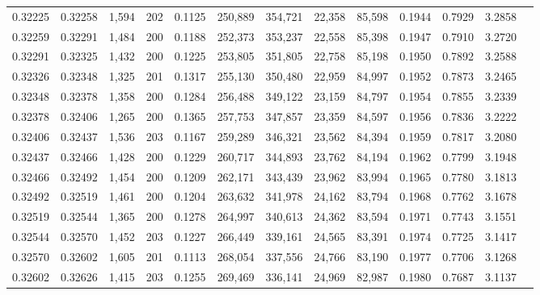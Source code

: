 \begin{tabular}{rrrrrrrrrrrrr}
0.32225 & 0.32258 & 1,594 & 202 &                                     0.1125 & 250,889 & 354,721 &  22,358 &  85,598 & 0.1944 & 0.7929 & 3.2858 \\
0.32259 & 0.32291 & 1,484 & 200 &                                     0.1188 & 252,373 & 353,237 &  22,558 &  85,398 & 0.1947 & 0.7910 & 3.2720 \\
0.32291 & 0.32325 & 1,432 & 200 &                                     0.1225 & 253,805 & 351,805 &  22,758 &  85,198 & 0.1950 & 0.7892 & 3.2588 \\
0.32326 & 0.32348 & 1,325 & 201 &                                     0.1317 & 255,130 & 350,480 &  22,959 &  84,997 & 0.1952 & 0.7873 & 3.2465 \\
0.32348 & 0.32378 & 1,358 & 200 &                                     0.1284 & 256,488 & 349,122 &  23,159 &  84,797 & 0.1954 & 0.7855 & 3.2339 \\
0.32378 & 0.32406 & 1,265 & 200 &                                     0.1365 & 257,753 & 347,857 &  23,359 &  84,597 & 0.1956 & 0.7836 & 3.2222 \\
0.32406 & 0.32437 & 1,536 & 203 &                                     0.1167 & 259,289 & 346,321 &  23,562 &  84,394 & 0.1959 & 0.7817 & 3.2080 \\
0.32437 & 0.32466 & 1,428 & 200 &                                     0.1229 & 260,717 & 344,893 &  23,762 &  84,194 & 0.1962 & 0.7799 & 3.1948 \\
0.32466 & 0.32492 & 1,454 & 200 &                                     0.1209 & 262,171 & 343,439 &  23,962 &  83,994 & 0.1965 & 0.7780 & 3.1813 \\
0.32492 & 0.32519 & 1,461 & 200 &                                     0.1204 & 263,632 & 341,978 &  24,162 &  83,794 & 0.1968 & 0.7762 & 3.1678 \\
0.32519 & 0.32544 & 1,365 & 200 &                                     0.1278 & 264,997 & 340,613 &  24,362 &  83,594 & 0.1971 & 0.7743 & 3.1551 \\
0.32544 & 0.32570 & 1,452 & 203 &                                     0.1227 & 266,449 & 339,161 &  24,565 &  83,391 & 0.1974 & 0.7725 & 3.1417 \\
0.32570 & 0.32602 & 1,605 & 201 &                                     0.1113 & 268,054 & 337,556 &  24,766 &  83,190 & 0.1977 & 0.7706 & 3.1268 \\
0.32602 & 0.32626 & 1,415 & 203 &                                     0.1255 & 269,469 & 336,141 &  24,969 &  82,987 & 0.1980 & 0.7687 & 3.1137 \\

\end{tabular}
